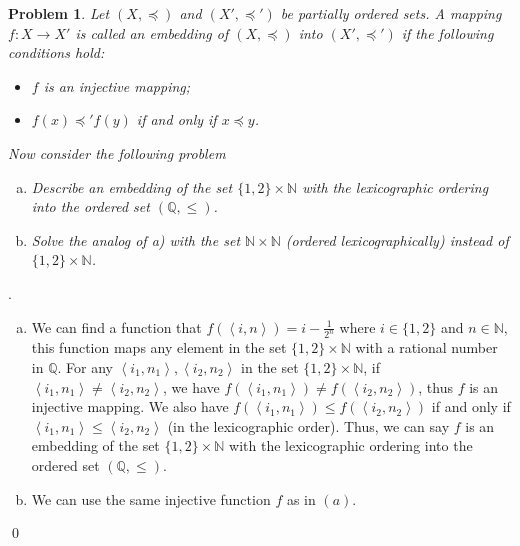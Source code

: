 \documentclass[12pt]{article}
\newtheorem{hw}{Problem}
\newenvironment{sol}
  {\par\vspace{3mm}\noindent{\it Solution}.}
  {\qed}
\begin{document}
\begin{hw}
Let $(X,\preceq)$ and $(X',\preceq')$ be partially ordered sets. A mapping $f:X\rightarrow X'$ is called an embedding of $(X,\preceq)$ into $(X',\preceq')$ if the following conditions hold:
\begin{itemize}
  \item $f$ is an injective mapping;
  \item $f(x)\preceq' f(y)$ if and only if $x\preceq y$.
\end{itemize}

Now consider the following problem

\begin{enumerate}[a)]
  \item Describe an embedding of the set $\{1,2\}\times \mathbb{N}$ with the lexicographic ordering into the ordered set $(\mathbb{Q},\leq)$.
  \item Solve the analog of a) with the set $\mathbb{N}\times \mathbb{N}$ (ordered lexicographically) instead of $\{1,2\}\times \mathbb{N}$.
 \end{enumerate}

 \end{hw}
 \begin{sol}
 	\begin{enumerate}[a)]
 		\item We can find a function that $f(\left\langle i,n\right\rangle ) = i - \frac{1}{2^{n}}$ where $i \in \{1,2\}$ and $n \in \mathbb{N}$, this function maps any element in the set $\{1,2\}\times \mathbb{N}$ with a rational number in $\mathbb{Q}$. For any $\left\langle i_{1}, n_{1}\right\rangle , \left\langle i_{2}, n_{2} \right\rangle $ in the set $\{1,2\}\times \mathbb{N}$, if $\left\langle i_{1}, n_{1}\right\rangle \neq \left\langle i_{2}, n_{2} \right\rangle $, we have $f(\left\langle i_{1},n_{1}\right\rangle ) \neq f(\left\langle i_{2},n_{2}\right\rangle )$, thus $f$ is an injective mapping. We also have $f(\left\langle i_{1},n_{1}\right\rangle ) \leq f(\left\langle i_{2},n_{2}\right\rangle )$ if and only if $\left\langle i_{1}, n_{1}\right\rangle \leq \left\langle i_{2}, n_{2} \right\rangle $ (in the lexicographic order). Thus, we can say $f$ is an embedding of the set $\{1,2\}\times \mathbb{N}$ with the lexicographic ordering into the ordered set $(\mathbb{Q},\leq)$.
 		
 		\item We can use the same injective function $f$ as in $(a)$.
 	\end{enumerate}
 \end{sol}
\end{document}
